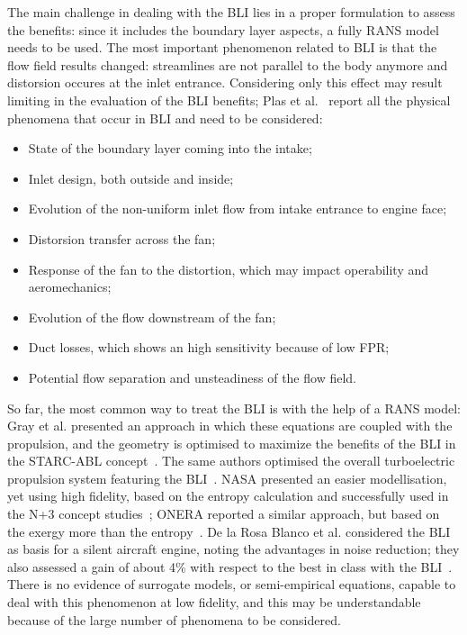 The main challenge in dealing with the BLI lies in a proper formulation to assess the benefits: since it includes the boundary layer aspects, a fully RANS model needs to be used. 
The most important phenomenon related to BLI is that the flow field results changed: streamlines are not parallel to the body anymore and distorsion occures at the inlet entrance. 
Considering only this effect may result limiting in the evaluation of the BLI benefits; Plas et al.~\cite{bib:plas} report all the physical phenomena that occur in BLI and need to be considered: 
\begin{itemize}
	\item State of the boundary layer coming into the intake;
	\item Inlet design, both outside and inside;
	\item Evolution of the non-uniform inlet flow from intake entrance to engine face;
	\item Distorsion transfer across the fan;
	\item Response of the fan to the distortion, which may impact operability and aeromechanics;
	\item Evolution of the flow downstream of the fan;
	\item Duct losses, which shows an high sensitivity because of low FPR; 
	\item Potential flow separation and unsteadiness of the flow field. 
\end{itemize}

So far, the most common way to treat the BLI is with the help of a RANS model: Gray et al. presented an approach in which these equations are coupled with the propulsion, and the geometry is optimised to maximize the benefits of the BLI in the STARC-ABL concept~\cite{bib:gray}.
The same authors optimised the overall turboelectric propulsion system featuring the BLI~\cite{bib:gray_bli_2018}. 
NASA presented an easier modellisation, yet using high fidelity, based on the entropy calculation and successfully used in the N+3 concept studies~\cite{bib:bwb_n3_vol1, bib:bwb_n3_vol2}; ONERA reported a similar approach, but based on the exergy more than the entropy~\cite{bib:arntz}. 
De la Rosa Blanco et al. considered the BLI as basis for a silent aircraft engine, noting the advantages in noise reduction; they also assessed a gain of about 4\% with respect to the best in class with the BLI~\cite{bib:silent_engine_aircraft}. 
There is no evidence of surrogate models, or semi-empirical equations, capable to deal with this phenomenon at low fidelity, and this may be understandable because of the large number of phenomena to be considered. 

